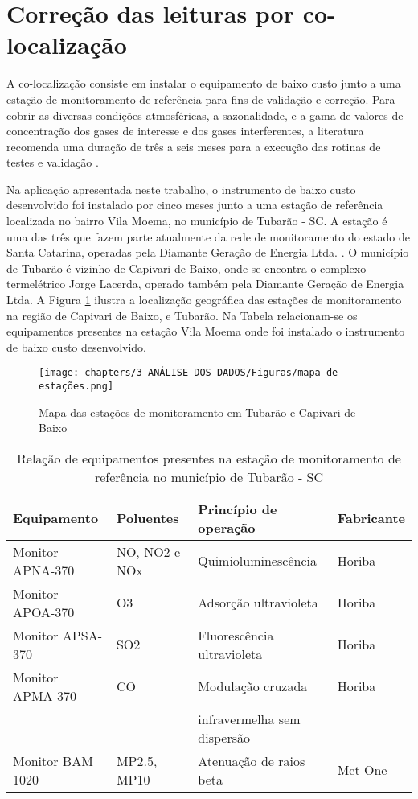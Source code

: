 \section{Correção das leituras por co-localização}

A co-localização consiste em instalar o equipamento de baixo custo junto a uma estação de monitoramento de referência para fins de validação e correção. Para cobrir as diversas condições atmosféricas, a sazonalidade, e a gama de valores de concentração dos gases de interesse e dos gases interferentes, a literatura recomenda uma duração de três a seis meses para a execução das rotinas de testes e validação \cite{Spinelle2013ProtocolPollution}.

Na aplicação apresentada neste trabalho, o instrumento de baixo custo desenvolvido foi instalado por cinco meses junto a uma estação de referência localizada no bairro Vila Moema, no município de Tubarão - SC. A estação é uma das três que fazem parte atualmente da rede de monitoramento do estado de Santa Catarina, operadas pela Diamante Geração de Energia Ltda. \cite{IMASC24}. O município de Tubarão é vizinho de Capivari de Baixo, onde se encontra o complexo termelétrico Jorge Lacerda, operado também pela Diamante Geração de Energia Ltda. A Figura \ref{fig:stations-map} ilustra a localização geográfica das estações de monitoramento na região de Capivari de Baixo, e Tubarão. Na Tabela relacionam-se os equipamentos presentes na estação Vila Moema onde foi instalado o instrumento de baixo custo desenvolvido.

\begin{figure}[h]
    \centering
    \caption{Mapa das estações de monitoramento em Tubarão e Capivari de Baixo}
    \texttt{[image: chapters/3-ANÁLISE DOS DADOS/Figuras/mapa-de-estações.png]}
    \label{fig:stations-map}
\end{figure}

\begin{table}[!ht]
    \centering
    \caption{Relação de equipamentos presentes na estação de monitoramento de referência no município de Tubarão - SC}
    \begin{tabular}{l|l|l|l}
        \textbf{Equipamento} & \textbf{Poluentes} & \textbf{Princípio de operação} & \textbf{Fabricante} \\
        \hline
        Monitor APNA-370 & NO, NO2 e NOx & Quimioluminescência & Horiba \\
        Monitor APOA-370 & O3 & Adsorção ultravioleta & Horiba \\
        Monitor APSA-370 & SO2 & Fluorescência ultravioleta & Horiba \\
        Monitor APMA-370 & CO & Modulação cruzada & Horiba \\
         & & infravermelha sem dispersão & \\
        Monitor BAM 1020 & MP2.5, MP10 & Atenuação de raios beta & Met One \\
        \hline
    \end{tabular}
    \label{tab:reference-equipments}
\end{table}

